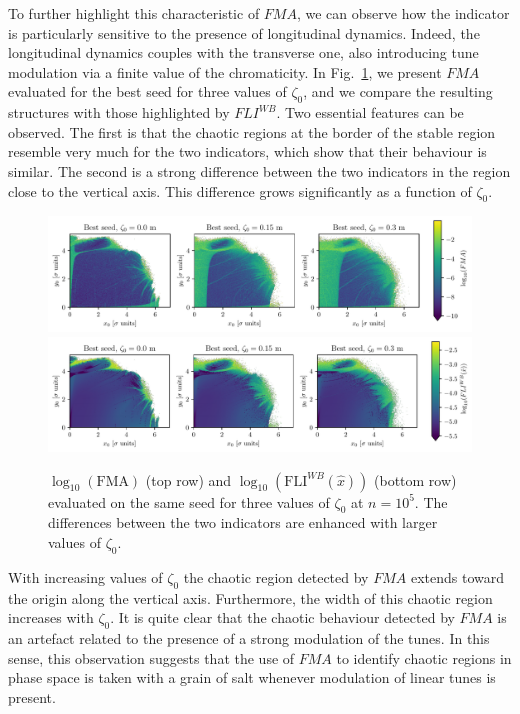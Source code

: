 To further highlight this characteristic of $FMA$, we can observe how the indicator is particularly sensitive to the presence of longitudinal dynamics. Indeed, the longitudinal dynamics couples with the transverse one, also introducing tune modulation via a finite value of the chromaticity. In Fig.~\ref{fig:fma_vs_fli}, we present $FMA$ evaluated for the best seed for three values of $\zeta_0$, and we compare the resulting structures with those highlighted by $FLI^{WB}$. Two essential features can be observed. The first is that the chaotic regions at the border of the stable region resemble very much for the two indicators, which show that their behaviour is similar. The second is a strong difference between the two indicators in the region close to the vertical axis. This difference grows significantly as a function of $\zeta_0$. 
%
\begin{figure}[ht]
    \centering
    \includegraphics[width=1.0\textwidth]{6_lhc_dynamic_indicators/figs/FMA.pdf}
    \includegraphics[width=1.0\textwidth]{6_lhc_dynamic_indicators/figs/FMA_addendum.pdf}
    \caption{$\log_{10}(\mathrm{FMA})$ (top row) and $\log_{10}(\mathrm{FLI}^{WB}(\hat{x}))$ (bottom row) evaluated on the same seed for three values of $\zeta_0$ at $n=10^5$. The differences between the two indicators are enhanced with larger values of $\zeta_0$.}
    \label{fig:fma_vs_fli}
\end{figure}
%
With increasing values of $\zeta_0$ the chaotic region detected by $FMA$ extends toward the origin along the vertical axis. Furthermore, the width of this chaotic region increases with $\zeta_0$. It is quite clear that the chaotic behaviour detected by $FMA$ is an artefact related to the presence of a strong modulation of the tunes. In this sense, this observation suggests that the use of $FMA$ to identify chaotic regions in phase space is taken with a grain of salt whenever modulation of linear tunes is present.   

